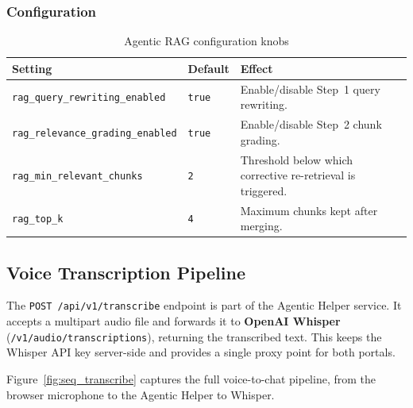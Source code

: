 \subsubsection{Configuration}

\begin{table}[H]
\centering
\caption{Agentic RAG configuration knobs}
\label{tab:agentic_rag_config}
\begin{tabularx}{\textwidth}{llX}
\toprule
\textbf{Setting} & \textbf{Default} & \textbf{Effect} \\
\midrule
\texttt{rag\_query\_rewriting\_enabled}  & \texttt{true}  & Enable/disable Step~1 query rewriting. \\
\texttt{rag\_relevance\_grading\_enabled}& \texttt{true}  & Enable/disable Step~2 chunk grading. \\
\texttt{rag\_min\_relevant\_chunks}      & \texttt{2}     & Threshold below which corrective re-retrieval is triggered. \\
\texttt{rag\_top\_k}                     & \texttt{4}     & Maximum chunks kept after merging. \\
\bottomrule
\end{tabularx}
\end{table}

\subsection{Voice Transcription Pipeline}

The \texttt{POST /api/v1/transcribe} endpoint is part of the Agentic Helper service. It accepts
a multipart audio file and forwards it to \textbf{OpenAI Whisper}
(\texttt{/v1/audio/transcriptions}), returning the transcribed text. This keeps the Whisper API
key server-side and provides a single proxy point for both portals.

Figure~\ref{fig:seq_transcribe} captures the full voice-to-chat pipeline, from the browser
microphone to the Agentic Helper to Whisper.

